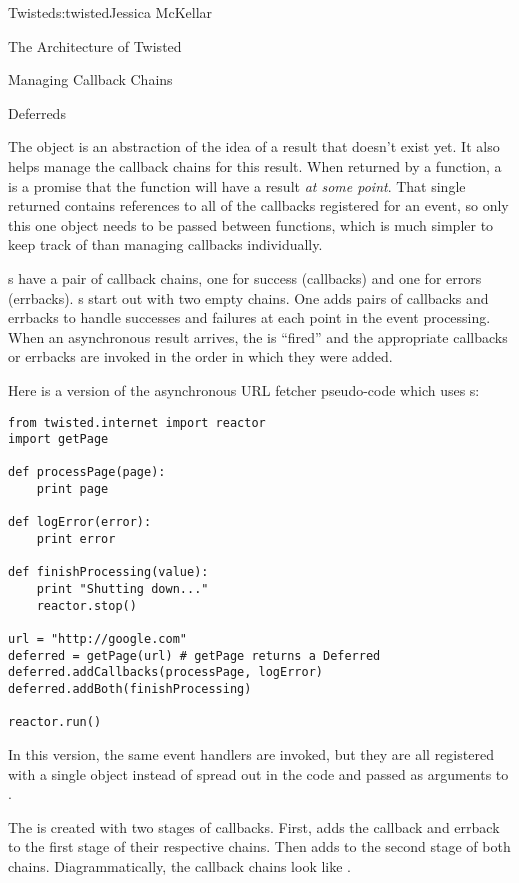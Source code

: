 \begin{aosachapter}{Twisted}{s:twisted}{Jessica McKellar}
\begin{aosasect1}{The Architecture of Twisted}
\begin{aosasect2}{Managing Callback Chains}
\begin{aosasect3}{Deferreds}

The  object is an abstraction of the idea of a result that
doesn't exist yet. It also helps manage the callback chains for this
result. When returned by a function, a  is a promise
that the function will have a result \emph{at some point}. That single
returned  contains references to all of the callbacks
registered for an event, so only this one object needs to be passed
between functions, which is much simpler to keep track of than
managing callbacks individually.

s have a pair of callback chains, one for success
(callbacks) and one for errors (errbacks). s start out with
two empty chains. One adds pairs of callbacks and errbacks to handle successes
and failures at each point in the event processing. When an asynchronous result
arrives, the  is ``fired'' and the appropriate callbacks or
errbacks are invoked in the order in which they were added.

Here is a version of the asynchronous URL fetcher pseudo-code which
uses s:

\begin{verbatim}
from twisted.internet import reactor
import getPage

def processPage(page):
    print page

def logError(error):
    print error

def finishProcessing(value):
    print "Shutting down..."
    reactor.stop()

url = "http://google.com"
deferred = getPage(url) # getPage returns a Deferred
deferred.addCallbacks(processPage, logError)
deferred.addBoth(finishProcessing)

reactor.run()
\end{verbatim}

In this version, the same event handlers are invoked, but they are all
registered with a single  object instead of spread out in
the code and passed as arguments to .

The  is created with two stages of callbacks. First,
 adds the  callback and
 errback to the first stage of their respective
chains. Then  adds  to the second
stage of both chains. Diagrammatically, the callback chains look like
.


\end{aosasect3}
\end{aosasect2}
\end{aosasect1}
\end{aosachapter}
